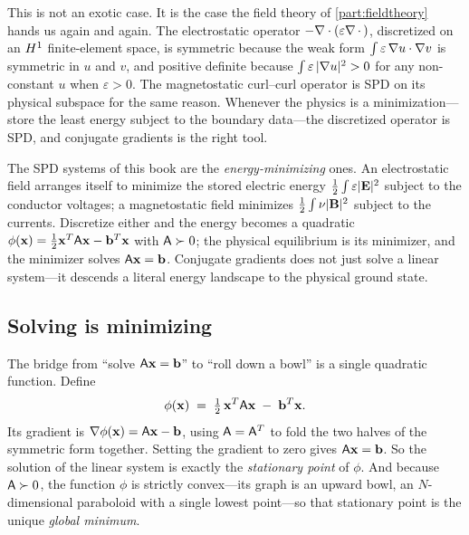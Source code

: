 This is not an exotic case. It is the case the field theory of
\cref{part:fieldtheory} hands us again and again. The electrostatic operator
$-\nabla\cdot(\varepsilon\nabla\,\cdot\,)$, discretized on an $H^1$ finite-element
space, is symmetric because the weak form $\int\varepsilon\,\nabla u\cdot\nabla v$
is symmetric in $u$ and $v$, and positive definite because
$\int\varepsilon\,\lvert\nabla u\rvert^2>0$ for any non-constant $u$ when
$\varepsilon>0$. The magnetostatic curl--curl operator is SPD on its physical
subspace for the same reason. Whenever the physics is a minimization---store the
least energy subject to the boundary data---the discretized operator is SPD, and
conjugate gradients is the right tool.

\begin{physicsbox}
The SPD systems of this book are the \emph{energy-minimizing} ones. An
electrostatic field arranges itself to minimize the stored electric energy
$\tfrac12\int\varepsilon\lvert\mathbf{E}\rvert^2$ subject to the conductor voltages; a
magnetostatic field minimizes $\tfrac12\int\nu\lvert\mathbf{B}\rvert^2$ subject to the
currents. Discretize either and the energy becomes a quadratic
$\phi(\mathbf{x})=\tfrac12\mathbf{x}^{T}\mathsf{A}\mathbf{x}-\mathbf{b}^{T}\mathbf{x}$ with $\mathsf{A}\succ0$; the
physical equilibrium is its minimizer, and the minimizer solves
$\mathsf{A}\mathbf{x}=\mathbf{b}$. Conjugate gradients does not just solve a linear system---it
descends a literal energy landscape to the physical ground state.
\end{physicsbox}

\subsection{Solving is minimizing}

The bridge from ``solve $\mathsf{A}\mathbf{x}=\mathbf{b}$'' to ``roll down a bowl'' is a single
quadratic function. Define
\begin{equation}
\label{eq:phi}
  \phi(\mathbf{x}) \;=\; \tfrac12\,\mathbf{x}^{T}\mathsf{A}\mathbf{x} \;-\; \mathbf{b}^{T}\mathbf{x} .
\end{equation}
Its gradient is $\nabla\phi(\mathbf{x})=\mathsf{A}\mathbf{x}-\mathbf{b}$, using $\mathsf{A}=\mathsf{A}^{T}$ to
fold the two halves of the symmetric form together. Setting the gradient to zero
gives $\mathsf{A}\mathbf{x}=\mathbf{b}$. So the solution of the linear system is exactly the
\emph{stationary point} of $\phi$. And because $\mathsf{A}\succ0$, the function
$\phi$ is strictly convex---its graph is an upward bowl, an $N$-dimensional
paraboloid with a single lowest point---so that stationary point is the unique
\emph{global minimum}.

